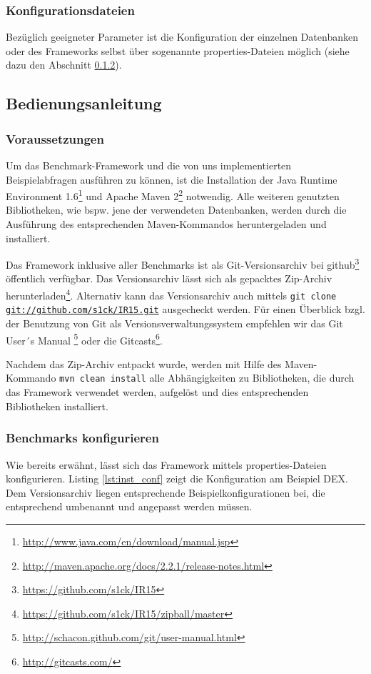 \documentclass[11pt, a4paper, oneside]{article} %
\begin{document}
\subsubsection{Konfigurationsdateien}
Bezüglich geeigneter Parameter ist die Konfiguration der einzelnen Datenbanken oder des Frameworks selbst über sogenannte properties-Dateien möglich (siehe dazu den Abschnitt \ref{subsubsec:benchmarks_conf}).

\subsection{Bedienungsanleitung}
\label{subsec:bedienungsanleitung}

\subsubsection{Voraussetzungen}
Um das Benchmark-Framework und die von uns implementierten Beispielabfragen ausführen zu können, ist die Installation der Java Runtime Environment 1.6\footnote{\url{http://www.java.com/en/download/manual.jsp}} und Apache Maven 2\footnote{\url{http://maven.apache.org/docs/2.2.1/release-notes.html}} notwendig. Alle weiteren genutzten Bibliotheken, wie bspw. jene der verwendeten Datenbanken, werden durch die Ausführung des entsprechenden Maven-Kommandos heruntergeladen und installiert.

Das Framework inklusive aller Benchmarks ist als Git-Versionsarchiv bei github\footnote{\url{https://github.com/s1ck/IR15}} öffentlich verfügbar. Das Versionsarchiv lässt sich als gepacktes Zip-Archiv herunterladen\footnote{\url{https://github.com/s1ck/IR15/zipball/master}}. Alternativ kann das Versionsarchiv auch mittels \texttt{git clone \url{git://github.com/s1ck/IR15.git}} ausgecheckt werden. Für einen Überblick bzgl. der Benutzung von Git als Versionsverwaltungssystem empfehlen wir das Git User´s Manual 
\footnote{\url{http://schacon.github.com/git/user-manual.html}} oder die Gitcasts\footnote{\url{http://gitcasts.com/}}.

Nachdem das Zip-Archiv entpackt wurde, werden mit Hilfe des Maven-Kommando \texttt{mvn clean install} alle Abhängigkeiten zu Bibliotheken, die durch das Framework verwendet werden, aufgelöst und dies entsprechenden Bibliotheken installiert.

\subsubsection{Benchmarks konfigurieren}
\label{subsubsec:benchmarks_conf}
Wie bereits erwähnt, lässt sich das Framework mittels properties-Dateien konfigurieren. Listing \ref{lst:inst_conf} zeigt die Konfiguration am Beispiel DEX. Dem Versionsarchiv liegen entsprechende Beispielkonfigurationen bei, die entsprechend umbenannt und angepasst werden müssen. 
\end{document}
